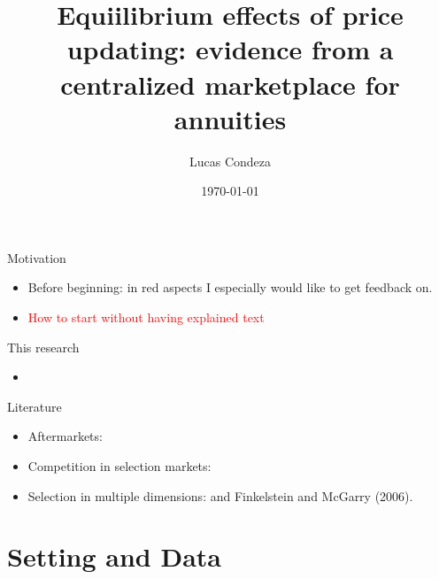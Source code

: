 \documentclass[10pt,aspectratio=169]{beamer}
\title{Equiilibrium effects of price updating: evidence from a centralized marketplace for annuities}
\author{%
 Lucas Condeza
\inst{1} \and
}
\institute{
  \inst{1} Yale University \\
}
\date{\today}
\begin{document}
\begin{frame}
  \titlepage
\end{frame}




\begin{frame}{Motivation}
\begin{itemize}
    \item  Before beginning: in red aspects I especially would like to get feedback on. 
    \item \textcolor{red}{How to start without having explained text}
\end{itemize}
\end{frame}


\begin{frame}{This research}
\begin{itemize}
    \item 
\end{itemize}
\end{frame}


\begin{frame}{Literature}
\begin{itemize}
    \item Aftermarkets: \textcite{allen_search_2019} %

    \item Competition in selection markets: \textcite{mahoney_imperfect_2017, cuesta_price_2018, cosconati_competing_2025}

    \item Selection in multiple dimensions: \textcite{finkelstein_adverse_2004} and Finkelstein and McGarry (2006).  
\end{itemize}

\end{frame}


\section{Setting and Data}
\end{document}
